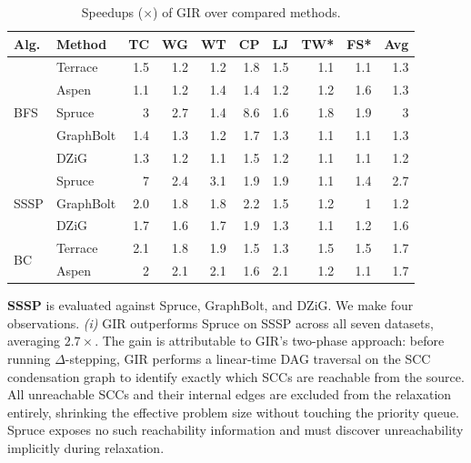 \begin{table}[t]
\centering
\setlength{\tabcolsep}{4.8pt}
\caption{Speedups ($\times$) of GIR over compared methods.}
\begin{tabular}{l l r r r r r r r r}
\toprule
\textbf{Alg.} & \textbf{Method}
& \textbf{TC} & \textbf{WG} & \textbf{WT} & \textbf{CP} & \textbf{LJ} & \textbf{TW*} & \textbf{FS*} & \textbf{Avg} \\
\midrule

\multirow{5}{*}{BFS}
& Terrace   & 1.5 & 1.2 & 1.2 & 1.8 & 1.5 & 1.1 & 1.1 & 1.3 \\
& Aspen     & 1.1 & 1.2 & 1.4 & 1.4 & 1.2 & 1.2 & 1.6 & 1.3 \\
& Spruce    &   3 & 2.7 & 1.4 & 8.6 & 1.6 & 1.8 & 1.9 &   3 \\
& GraphBolt & 1.4 & 1.3 & 1.2 & 1.7 & 1.3 & 1.1 & 1.1 & 1.3 \\
& DZiG      & 1.3 & 1.2 & 1.1 & 1.5 & 1.2 & 1.1 & 1.1 & 1.2 \\

\midrule

\multirow{3}{*}{SSSP}
& Spruce    &   7 & 2.4 & 3.1 & 1.9 & 1.9 & 1.1 & 1.4 & 2.7 \\
& GraphBolt & 2.0 & 1.8 & 1.8 & 2.2 & 1.5 & 1.2 & 1 & 1.2 \\
& DZiG      & 1.7 & 1.6 & 1.7 & 1.9 & 1.3 & 1.1 & 1.2 & 1.6 \\

\midrule

\multirow{2}{*}{BC}
& Terrace & 2.1 & 1.8 & 1.9 & 1.5 & 1.3 & 1.5 & 1.5 & 1.7 \\
& Aspen   & 2 & 2.1 & 2.1 & 1.6 & 2.1 & 1.2 & 1.1 & 1.7 \\

\bottomrule
\end{tabular}
\label{tab:speedup_summary_alg}
\end{table}

\textbf{SSSP} is evaluated against Spruce, GraphBolt, and DZiG.
We make four observations.
\textit{(i)} GIR outperforms Spruce on SSSP across all seven datasets, averaging $2.7\times$.
The gain is attributable to GIR's two-phase approach: before running $\Delta$-stepping, GIR performs a linear-time DAG traversal on the SCC condensation graph to identify exactly which SCCs are reachable from the source.
All unreachable SCCs and their internal edges are excluded from the relaxation entirely, shrinking the effective problem size without touching the priority queue.
Spruce exposes no such reachability information and must discover unreachability implicitly during relaxation.

